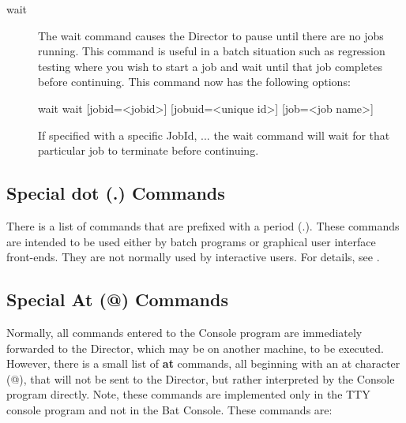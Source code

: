 \begin{description}
\item [wait]
   The wait command causes the Director to pause  until there are no jobs
   running. This command is useful in  a batch situation such as regression
   testing where you  wish to start a job and wait until that job completes
   before continuing. This command now has the following options:

\begin{bconsole}{wait}
wait [jobid=<jobid>] [jobuid=<unique id>] [job=<job name>]
\end{bconsole}

   If specified with a specific JobId, ... the wait command will wait
   for that particular job to terminate before continuing.

\end{description}

\subsection{Special dot (.) Commands}
\label{dotcommands}

There is a list of commands that are prefixed with a period (.). These
commands are intended to be used either by batch programs or graphical user
interface front-ends. They are not normally used by interactive users.
For details, see \bareosDeveloperGuideDotCommands.


\subsection{Special At (@) Commands}
\label{atcommands}

Normally, all commands entered to the Console program are immediately
forwarded to the Director, which may be on another machine, to be executed.
However, there is a small list of {\bf at} commands, all beginning with an at
character (@), that will not be sent to the Director, but rather interpreted
by the Console program directly. Note, these commands are implemented only in
the TTY console program and not in the Bat Console. These commands are:


